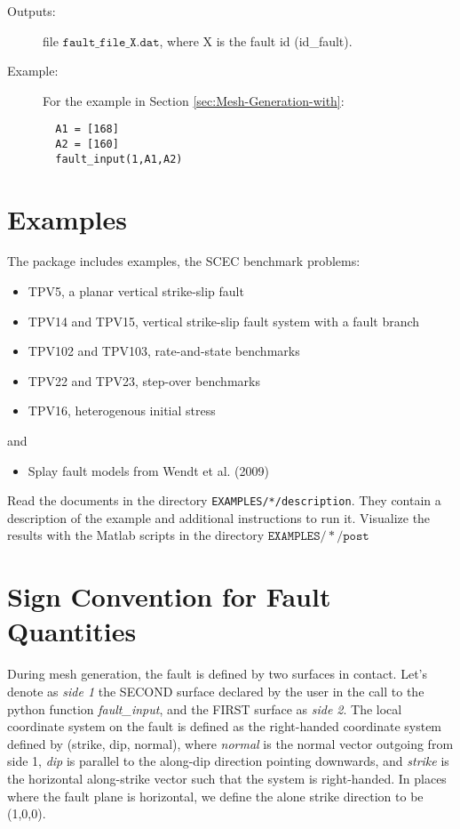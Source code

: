 \begin{description}
\item [{Outputs:}] file $\mathtt{fault\_file\_X.dat}$, where X is the
fault id (id\_fault).
\item [{Example:}] For the example in Section \ref{sec:Mesh-Generation-with}:
\begin{verbatim}
  A1 = [168]
  A2 = [160]
  fault_input(1,A1,A2)
\end{verbatim}
\end{description}

\section{Examples}

The package includes examples, the SCEC benchmark problems:
\begin{itemize}
\item TPV5, a planar vertical strike-slip fault
\item TPV14 and TPV15, vertical strike-slip fault system with a fault branch
\item TPV102 and TPV103, rate-and-state benchmarks
\item TPV22 and TPV23, step-over benchmarks
\item TPV16, heterogenous initial stress
\end{itemize}
and
\begin{itemize}
\item Splay fault models from Wendt et al. (2009)\\

\end{itemize}
Read the documents in the directory \texttt{EXAMPLES/*/description}.
They contain a description of the example and additional instructions
to run it. Visualize the results with the Matlab scripts in the directory
$\mathtt{EXAMPLES/*/post}$


\section{Sign Convention for Fault Quantities}\label{sec:Sign-Convention-for}

During mesh generation, the fault is defined by two surfaces in contact.
Let's denote as \textquotedbl{}\emph{side 1}\textquotedbl{} the SECOND
surface declared by the user in the call to the python function \textquotedbl{}\emph{fault\_input}\textquotedbl{},
and the FIRST surface as \textquotedbl{}\emph{side 2}\textquotedbl{}.
The local coordinate system on the fault is defined as the right-handed
coordinate system defined by (strike, dip, normal), where \textquotedbl{}\emph{normal}\textquotedbl{}
is the normal vector outgoing from side 1, \textquotedbl{}\emph{dip}\textquotedbl{}
is parallel to the along-dip direction pointing downwards, and \textquotedbl{}\emph{strike}\textquotedbl{}
is the horizontal along-strike vector such that the system is right-handed. In places where the fault plane is horizontal,
we define the alone strike direction to be (1,0,0).\\


